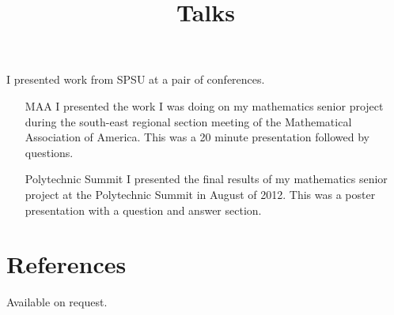 \documentclass[margintitle,line]{res}
\begin{document}
\begin{resume}
\title{Talks}
\begin{position}
I presented work from SPSU at a pair of conferences.
\begin{itemize}
\item[MAA] I presented the work I was doing on my mathematics senior project during the south-east regional section meeting of the Mathematical Association of America. This was a 20 minute presentation followed by questions.
\item[Polytechnic Summit] I presented the final results of my mathematics senior project at the Polytechnic Summit in August of 2012. This was a poster presentation with a question and answer section.
\end{itemize}
\end{position}

\section{References}

Available on request.

\end{resume}
\end{document}
